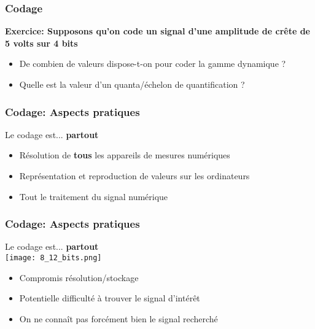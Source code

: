 \documentclass{beamer}
\begin{document}
\begin{frame}
\frametitle{Codage} 
\textbf{Exercice: Supposons qu'on code un signal d'une amplitude de crête de 5 volts sur 4 bits}\\
\vspace{1cm}
\begin{itemize}
\item<2-> De combien de valeurs dispose-t-on pour coder la gamme dynamique ?  
\vspace{0.2cm}
\item<3-> Quelle est la valeur d'un quanta/échelon de quantification ?  
\end{itemize}

\end{frame} 


\begin{frame}
\frametitle{Codage: Aspects pratiques}
Le codage est... \textbf{partout}\\
\vspace{0.2cm}
\begin{itemize}
\item Résolution de \textbf{tous} les appareils de mesures numériques
\item Représentation et reproduction de valeurs sur les ordinateurs
\item Tout le traitement du signal numérique
\end{itemize}
\end{frame}

\begin{frame}
\frametitle{Codage: Aspects pratiques}
Le codage est... \textbf{partout}\\
\vspace{0.2cm}
\texttt{[image: 8\_12\_bits.png]}\\
\vspace{0.2cm}
\begin{itemize}
\item Compromis résolution/stockage
\vspace{0.1cm}
\item Potentielle difficulté à trouver le signal d'intérêt
\vspace{0.1cm}
\item On ne connaît pas forcément bien le signal recherché
\end{itemize}
\end{frame}
\end{document}
